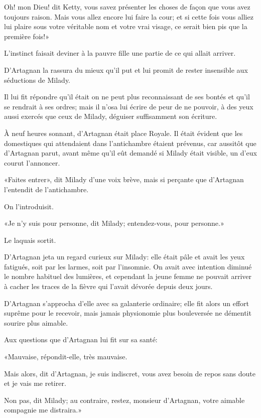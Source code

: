 \speak  Oh! mon Dieu! dit Ketty, vous savez présenter les choses de façon que vous avez toujours raison. Mais vous allez encore lui faire la cour; et si cette fois vous alliez lui plaire sous votre véritable nom et votre vrai visage, ce serait bien pis que la première fois!» 

L'instinct faisait deviner à la pauvre fille une partie de ce qui allait arriver. 

D'Artagnan la rassura du mieux qu'il put et lui promit de rester insensible aux séductions de Milady. 

Il lui fit répondre qu'il était on ne peut plus reconnaissant de ses bontés et qu'il se rendrait à ses ordres; mais il n'osa lui écrire de peur de ne pouvoir, à des yeux aussi exercés que ceux de Milady, déguiser suffisamment son écriture. 

À neuf heures sonnant, d'Artagnan était place Royale. Il était évident que les domestiques qui attendaient dans l'antichambre étaient prévenus, car aussitôt que d'Artagnan parut, avant même qu'il eût demandé si Milady était visible, un d'eux courut l'annoncer. 

«Faites entrer», dit Milady d'une voix brève, mais si perçante que d'Artagnan l'entendit de l'antichambre. 

On l'introduisit. 

«Je n'y suis pour personne, dit Milady; entendez-vous, pour personne.» 

Le laquais sortit. 

D'Artagnan jeta un regard curieux sur Milady: elle était pâle et avait les yeux fatigués, soit par les larmes, soit par l'insomnie. On avait avec intention diminué le nombre habituel des lumières, et cependant la jeune femme ne pouvait arriver à cacher les traces de la fièvre qui l'avait dévorée depuis deux jours. 

D'Artagnan s'approcha d'elle avec sa galanterie ordinaire; elle fit alors un effort suprême pour le recevoir, mais jamais physionomie plus bouleversée ne démentit sourire plus aimable. 

Aux questions que d'Artagnan lui fit sur sa santé: 

«Mauvaise, répondit-elle, très mauvaise. 

\speak  Mais alors, dit d'Artagnan, je suis indiscret, vous avez besoin de repos sans doute et je vais me retirer. 

\speak  Non pas, dit Milady; au contraire, restez, monsieur d'Artagnan, votre aimable compagnie me distraira.» 

